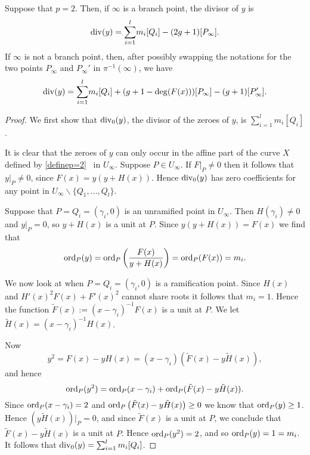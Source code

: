     \begin{prop}\label{divyp=2}
    Suppose that $p=2$.
    Then, if $\infty$ is a branch point, the divisor of $y$ is
        \begin{equation*}
        \operatorname{div}(y) = 
         {\displaystyle \sum_{i=1}^l} m_i[Q_i] -(2g+1)[P_\infty].
        \end{equation*}
    If $\infty$ is not a branch point, then, after possibly swapping the notations for the two points $P_\infty$ and $P_\infty'$ in $\pi^{-1}(\infty)$, we have
        \begin{equation*}
        \operatorname{div}(y) = {\displaystyle \sum_{i=1}^l} m_i[Q_i] +(g+1-\deg(F(x)))[P_\infty] - (g+1)[P_\infty'].
        \end{equation*}
    \end{prop}
    \begin{proof}
    We first show that $\operatorname{div}_0(y)$, the divisor of the zeroes of $y$, is $\sum_{i=1}^l m_i [Q_i]$.
    
    It is clear that the zeroes of $y$ can only occur in the affine part of the curve $X$ defined by \eqref{definep=2} \ie~in $U_\infty$.
    Suppose $P\in U_\infty$.
    If $\left. F \right|_P \neq 0$ then it follows that $y|_P \neq 0$, since $F(x) = y (y + H(x))$.
    Hence $\operatorname{div}_0(y)$ has zero coefficients for any point in $U_\infty\backslash \{Q_1, \ldots, Q_l \}$.
    
    Suppose that $P= Q_i = (\gamma_i, 0)$ is an unramified point in $U_\infty$.
    Then $H(\gamma_i) \neq 0$ and $\left. y \right|_P = 0$, so $y + H(x)$ is a unit at $P$.
    Since $y(y+H(x)) = F(x)$ we find that
        \begin{equation*}
        \operatorname{ord}_P(y) = \operatorname{ord}_P\left( \frac{F(x)}{y + H(x)} \right) = \operatorname{ord}_P(F(x)) = m_i.
        \end{equation*}
    
    We now look at when $P = Q_i = (\gamma_i, 0)$ is a ramification point.
    Since $H(x)$ and $H'(x)^2F(x) + F'(x)^2$ cannot share roots it follows that $m_i = 1$.
    Hence the function $\tilde F(x) := (x- \gamma_i)^{-1}F(x)$ is a unit at $P$.
    We let $\tilde H(x) = (x- \gamma_i)^{-1}H(x)$.
    
    
    Now 
        \[
        y^2 = F(x) - y H(x) = (x- \gamma_i) \left(\tilde F(x) - y \tilde H(x)\right),
        \]
    and hence
        \[
        \operatorname{ord}_P(y^2 ) = \operatorname{ord}_P(x-\gamma_i) + \operatorname{ord}_P(\tilde F(x) - y \tilde H(x)).
        \]
    Since $\operatorname{ord}_P(x-\gamma_i) = 2$ and $\operatorname{ord}_P\left(\tilde F(x) - y \tilde H(x)\right) \geq 0$ we know that $\operatorname{ord}_P(y) \geq 1$.
    Hence $(y \tilde H(x)) \big|_P = 0$, and since $\tilde F(x)$ is a unit at $P$, we conclude that $\tilde F(x) - y \tilde H(x)$ is a unit at $P$.
    Hence $\operatorname{ord}_P(y^2) = 2$, and so $\operatorname{ord}_P(y) = 1 = m_i$.
    It follows that $\operatorname{div}_0(y) =  \sum_{i=1}^l m_i [Q_i]$.
    

\end{proof}
